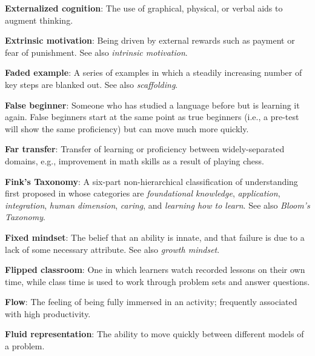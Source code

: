 \textbf{\hypertarget{g:externalized-cognition}{Externalized cognition}\label{g:externalized-cognition}}: The use
of graphical, physical, or verbal aids to augment thinking.

\textbf{\hypertarget{g:extrinsic-motivation}{Extrinsic motivation}\label{g:extrinsic-motivation}}: Being driven
by external rewards such as payment or fear of punishment. See also
\emph{intrinsic motivation}.

\textbf{\hypertarget{g:faded-example}{Faded example}\label{g:faded-example}}: A series of examples in
which a steadily increasing number of key steps are blanked out. See
also \emph{scaffolding}.

\textbf{\hypertarget{g:false-beginner}{False beginner}\label{g:false-beginner}}: Someone who has studied a
language before but is learning it again. False beginners start at the
same point as true beginners (i.e., a pre-test will show the same
proficiency) but can move much more quickly.

\textbf{\hypertarget{g:far-transfer}{Far transfer}\label{g:far-transfer}}: Transfer of learning or
proficiency between widely-separated domains, e.g., improvement in math
skills as a result of playing chess.

\textbf{\hypertarget{g:finks-taxonomy}{Fink's Taxonomy}\label{g:finks-taxonomy}}: A six-part
non-hierarchical classification of understanding first proposed in
\cite{Fink2013} whose categories are \emph{foundational knowledge},
\emph{application}, \emph{integration}, \emph{human dimension}, \emph{caring}, and \emph{learning
how to learn}. See also \emph{Bloom's Taxonomy}.

\textbf{\hypertarget{g:fixed-mindset}{Fixed mindset}\label{g:fixed-mindset}}: The belief that an ability
is innate, and that failure is due to a lack of some necessary
attribute. See also \emph{growth mindset}.

\textbf{\hypertarget{g:flipped-classroom}{Flipped classroom}\label{g:flipped-classroom}}: One in which
learners watch recorded lessons on their own time, while class time is
used to work through problem sets and answer questions.

\textbf{\hypertarget{g:flow}{Flow}\label{g:flow}}: The feeling of being fully immersed in an
activity; frequently associated with high productivity.

\textbf{\hypertarget{g:fluid-representation}{Fluid representation}\label{g:fluid-representation}}: The ability
to move quickly between different models of a problem.

